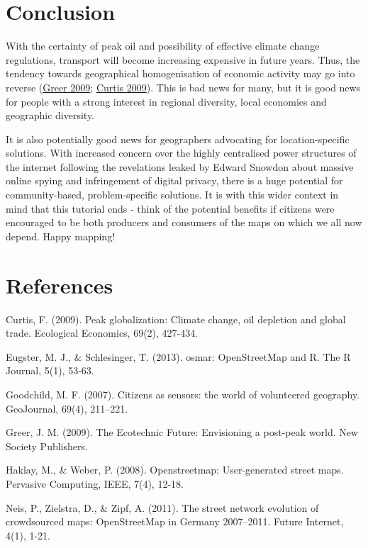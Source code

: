 \documentclass[]{article}
\begin{document}
\section{Conclusion}

With the certainty of peak oil and possibility of effective climate
change regulations, transport will become increasing expensive in future
years. Thus, the tendency towards geographical homogenisation of
economic activity may go into reverse
(\href{http://books.google.co.uk/books?hl=en\&lr=\&id=mkV\_knlze0QC\&oi=fnd\&pg=PP2\&dq=ecotechnic+future\&ots=nATRuCVL31\&sig=bwafIZ7kfmZMK1EscQcKyIGeYsU\&redir\_esc=y\#v=onepage\&q=ecotechnic\%20future\&f=false}{Greer
2009};
\href{http://www.sciencedirect.com/science/article/pii/S0921800909003334}{Curtis
2009}). This is bad news for many, but it is good news for people with a
strong interest in regional diversity, local economies and geographic
diversity.

It is also potentially good news for geographers advocating for
location-specific solutions. With increased concern over the highly
centralised power structures of the internet following the revelations
leaked by Edward Snowdon about massive online spying and infringement of
digital privacy, there is a huge potential for community-based,
problem-specific solutions. It is with this wider context in mind that
this tutorial ends - think of the potential benefits if citizens were
encouraged to be both producers and consumers of the maps on which we
all now depend. Happy mapping!

\section{References}

Curtis, F. (2009). Peak globalization: Climate change, oil depletion and
global trade. Ecological Economics, 69(2), 427-434.

Eugster, M. J., \& Schlesinger, T. (2013). osmar: OpenStreetMap and R.
The R Journal, 5(1), 53-63.

Goodchild, M. F. (2007). Citizens as sensors: the world of volunteered
geography. GeoJournal, 69(4), 211--221.

Greer, J. M. (2009). The Ecotechnic Future: Envisioning a post-peak
world. New Society Publishers.

Haklay, M., \& Weber, P. (2008). Openstreetmap: User-generated street
maps. Pervasive Computing, IEEE, 7(4), 12-18.

Neis, P., Zielstra, D., \& Zipf, A. (2011). The street network evolution
of crowdsourced maps: OpenStreetMap in Germany 2007--2011. Future
Internet, 4(1), 1-21.
\end{document}
